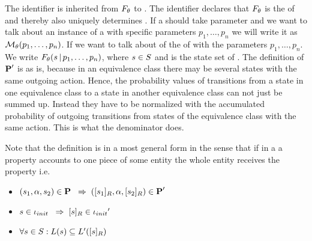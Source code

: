 \documentclass[preview]{standalone}
\begin{document}
The identifier \viewppty is inherited from ${F_{{\theta}}}$ to \view. The identifier declares that ${F_{{\theta}}}$ is the \grpfctN of \view and thereby also uniquely determines \view. If a \viewN should take parameter and we want to talk about an instance of a \viewN with specific parameters $p_1, \dots, p_n$ we will write it as ${{{{\mathcal{M}}}}_{{\theta}}}(p_1, \dots, p_n)$. If we want to talk about of the \grpfctN \grpfct of \view with the parameters $p_1, \dots, p_n$. We write ${F_{{\theta}}}({s} {\,|\,} p_1, \dots, p_n)$, where ${s} \in {S}$ and \states is the state set of \chgph. The definition of ${{\textbf{P}}}'$ is as is, because in an equivalence class there may be several states with the same outgoing action. Hence, the probability values of transitions from a state in one equivalence class to a state in another equivalence class can not just be summed up. Instead they have to be normalized with the accumulated probability of outgoing transitions from states of the equivalence class with the same action. This is what the denominator does.

Note that the definition is in a most general form in the sense that if in a \viewN a property accounts to one piece of some entity the whole entity receives the property i.e. 
\begin{itemize}	
	\item $({s}_1, {\alpha}, {s}_2) \in {\ensuremath{{\textbf{P}}}} {\hspace{3mm}\Rightarrow\hspace{2mm}} ({{[{s}_1]_{{R}}}}, {\alpha}, {{[{s}_2]_{{R}}}}) \in {\ensuremath{{\textbf{P}}}}'$
	\item ${s} \in {\ensuremath{{\iota_{init}}}} {\hspace{3mm}\Rightarrow\hspace{2mm}} {\ensuremath{{[{s}]_{{R}}}}} \in {\iota_{init}}'$
	\item $\forall {s} \in {S} : {L}({s}) \subseteq {L}'({{[{s}]_{{R}}}})$
\end{itemize}
\end{document}
